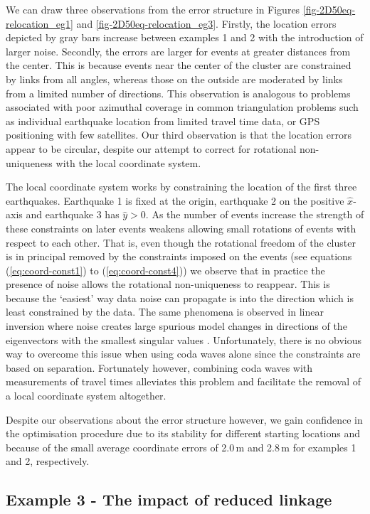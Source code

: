 \documentclass[extra]{gji}
\begin{document}
We can draw three observations from the error structure in Figures
\ref{fig-2D50eq-relocation_eg1} and \ref{fig-2D50eq-relocation_eg3}.
Firstly, the location errors depicted by gray bars increase between
examples 1 and 2 with the introduction of larger noise. Secondly,
the errors are larger for events at greater distances from the
center. This is because events near the center of the cluster are
constrained by links from all angles, whereas those on the outside
are moderated by links from a limited number of directions. This
observation is analogous to problems associated with poor azimuthal
coverage in common triangulation problems such as individual
earthquake location from limited travel time data, or GPS
positioning with few satellites. Our third observation is that the
location errors appear to be circular, despite our attempt to
correct for rotational non-uniqueness with the local coordinate
system.

The local coordinate system works by constraining the location of
the first three earthquakes. Earthquake 1 is fixed at the origin,
earthquake 2 on the positive $\hat{x}$-axis and earthquake 3 has
$\hat{y}>0$. As the number of events increase the strength of these
constraints on later events weakens allowing small rotations
of events with respect to each other. That is, even though the
rotational freedom of the cluster is in principal removed by the
constraints imposed on the events (see equations (\ref{eq:coord-const1}) to
(\ref{eq:coord-const4})) we observe that in practice the presence of
noise allows the rotational non-uniqueness to reappear. This is
because the `easiest' way data noise can propagate is into the
direction which is least constrained by the data. The same phenomena
is observed in linear inversion where noise creates large spurious
model changes in directions of the eigenvectors with the smallest
singular values \citep{dr_Aster05a}. Unfortunately, there is
no obvious way to overcome this issue when using coda waves alone
since the constraints are based on separation. Fortunately however,
combining coda waves with measurements of travel times alleviates
this problem and facilitate the removal of a local coordinate system
altogether.

Despite our observations about the error structure however, we gain
confidence in the optimisation procedure due to its stability for
different starting locations and because of the small average
coordinate errors of 2.0\,m and 2.8\,m for examples 1 and 2,
respectively.

\subsection{Example 3 - The impact of reduced linkage}
\end{document}
